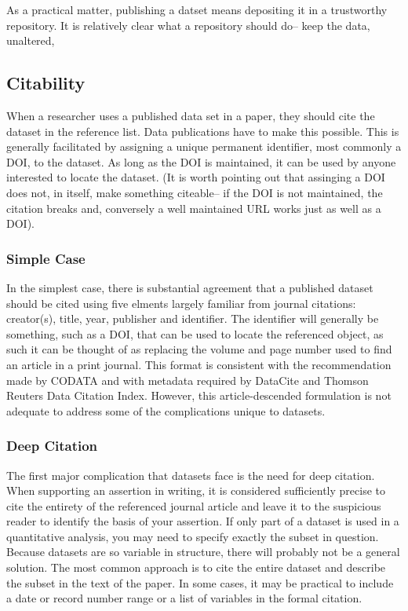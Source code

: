 \documentclass{article}
\begin{document}
As a practical matter, publishing a datset means depositing it in a trustworthy repository.
It is relatively clear what a repository should do-- keep the data, unaltered,

\subsection{Citability}\label{citability}

When a researcher uses a published data set in a paper, they should cite the dataset in the reference list.
Data publications have to make this possible.
This is generally facilitated by assigning a unique permanent identifier, most commonly a DOI, to the dataset.
As long as the DOI is maintained, it can be used by anyone interested to locate the dataset. (It is worth pointing out that assinging a DOI does not, in itself, make something citeable-- if the DOI is not maintained, the citation breaks and, conversely a well maintained URL works just as well as a DOI).

\subsubsection{Simple Case}\label{simple-case}

In the simplest case, there is substantial agreement that a published dataset should be cited using five elments largely familiar from journal citations: creator(s), title, year, publisher and identifier.
The identifier will generally be something, such as a DOI, that can be used to locate the referenced object, as such it can be thought of as replacing the volume and page number used to find an article in a print journal.
This format is consistent with the recommendation made by CODATA and with metadata required by DataCite and Thomson Reuters Data Citation Index.
However, this article-descended formulation is not adequate to address some of the complications unique to datasets.

\subsubsection{Deep Citation}\label{deep-citation}

The first major complication that datasets face is the need for deep citation.
When supporting an assertion in writing, it is considered sufficiently precise to cite the entirety of the referenced journal article and leave it to the suspicious reader to identify the basis of your assertion.
If only part of a dataset is used in a quantitative analysis, you may need to specify exactly the subset in question.
Because datasets are so variable in structure, there will probably not be a general solution.
The most common approach is to cite the entire dataset and describe the subset in the text of the paper.
In some cases, it may be practical to include a date or record number range or a list of variables in the formal citation.
\end{document}
